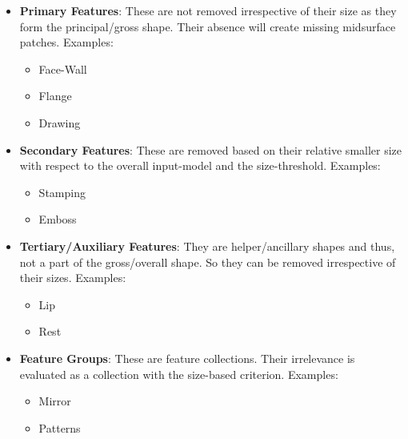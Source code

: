 \begin{minipage}[c]{0.8\linewidth}
\begin{minipage}[t]{0.5\linewidth}
\begin{itemize}
[noitemsep,topsep=2pt,parsep=2pt,partopsep=2pt]
\item \textbf{Primary Features}: These are not removed irrespective of their size as they form the principal/gross shape.  Their absence will create missing midsurface patches. Examples:
	\begin{itemize} [noitemsep,topsep=2pt,parsep=2pt,partopsep=2pt]
	\item Face-Wall
	\item Flange
	\item Drawing
	\end{itemize}
\item \textbf{Secondary Features}: These are removed based on their relative smaller size with respect to the overall input-model and the size-threshold.  
 Examples:
	\begin{itemize} [noitemsep,topsep=2pt,parsep=2pt,partopsep=2pt]
	\item Stamping
	\item Emboss 
	\end{itemize}
	
\item \textbf{Tertiary/Auxiliary Features}: They are helper/ancillary shapes and thus, not a part of the gross/overall shape. So they can be removed irrespective of their sizes.
Examples:
	\begin{itemize} [noitemsep,topsep=2pt,parsep=2pt,partopsep=2pt]
	\item Lip
	\item Rest 
	\end{itemize}
	
		
\item \textbf{Feature Groups}: These are feature collections. Their irrelevance is evaluated as a collection with the size-based criterion. 	Examples:
\begin{itemize} [noitemsep,topsep=2pt,parsep=2pt,partopsep=2pt]
	\item Mirror
	\item Patterns
	\end{itemize}
\end{itemize}


\end{minipage}
\end{minipage}

